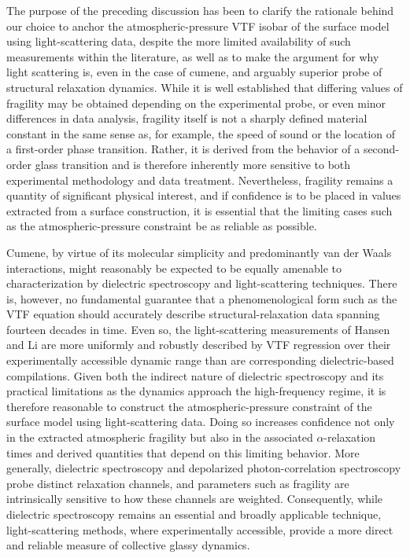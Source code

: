 The purpose of the preceding discussion has been to clarify the rationale behind our choice to anchor the atmospheric-pressure VTF isobar of the surface model using light-scattering data, despite the more limited availability of such measurements within the literature, as well as to make the argument for why light scattering is, even in the case of cumene, and arguably superior probe of structural relaxation dynamics. While it is well established that differing values of fragility may be obtained depending on the experimental probe, or even minor differences in data analysis, fragility itself is not a sharply defined material constant in the same sense as, for example, the speed of sound or the location of a first-order phase transition. Rather, it is derived from the behavior of a second-order glass transition and is therefore inherently more sensitive to both experimental methodology and data treatment. Nevertheless, fragility remains a quantity of significant physical interest, and if  confidence is to be placed in values extracted from a surface construction, it is essential that the limiting cases such as the atmospheric-pressure constraint be as reliable as possible.

Cumene, by virtue of its molecular simplicity and predominantly van der Waals interactions, might reasonably be expected to be equally amenable to characterization by dielectric spectroscopy and light-scattering techniques. There is, however, no fundamental guarantee that a phenomenological form such as the VTF equation should accurately describe structural-relaxation data spanning fourteen decades in time. Even so, the light-scattering measurements of Hansen \etal and Li \etal are more uniformly and robustly described by VTF regression over their experimentally accessible dynamic range than are corresponding dielectric-based compilations. Given both the indirect nature of dielectric spectroscopy and its practical limitations as the dynamics approach the high-frequency regime, it is therefore reasonable to construct the atmospheric-pressure constraint of the surface model using light-scattering data. Doing so increases confidence not only in the extracted atmospheric fragility but also in the associated $\alpha$-relaxation times and derived quantities that depend on this limiting behavior. More generally, dielectric spectroscopy and depolarized photon-correlation spectroscopy probe distinct relaxation channels, and parameters such as fragility are intrinsically sensitive to how these channels are weighted. Consequently, while dielectric spectroscopy remains an essential and broadly applicable technique, light-scattering methods, where experimentally accessible, provide a more direct and reliable measure of collective glassy dynamics.


